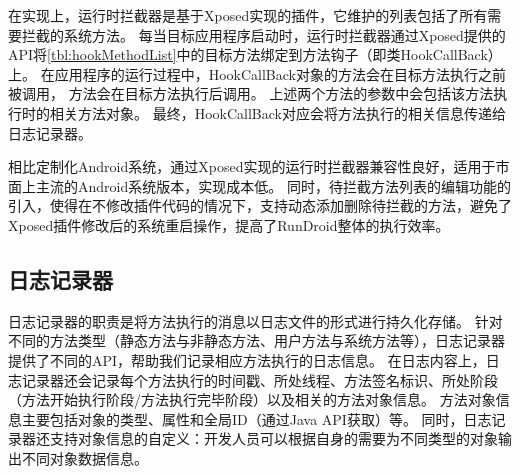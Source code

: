 

在实现上，运行时拦截器是基于Xposed\cite{Xposed}实现的插件，它维护的列表包括了所有需要拦截的系统方法。%
每当目标应用程序启动时，运行时拦截器通过Xposed提供的API将\autoref{tbl:hookMethodList}中的目标方法绑定到方法钩子（即类HookCallBack）上。
在应用程序的运行过程中，HookCallBack对象的方法会在目标方法执行之前被调用，
方法会在目标方法执行后调用。
上述两个方法的参数中会包括该方法执行时的相关方法对象。
最终，HookCallBack对应会将方法执行的相关信息传递给日志记录器。



相比定制化Android系统，通过Xposed实现的运行时拦截器兼容性良好，适用于市面上主流的Android系统版本，实现成本低。
同时，待拦截方法列表的编辑功能的引入，使得在不修改插件代码的情况下，支持动态添加删除待拦截的方法，避免了Xposed插件修改后的系统重启操作，提高了RunDroid整体的执行效率。
 

\subsection{日志记录器}

日志记录器的职责是将方法执行的消息以日志文件的形式进行持久化存储。
针对不同的方法类型（静态方法与非静态方法、用户方法与系统方法等），日志记录器提供了不同的API，帮助我们记录相应方法执行的日志信息。
在日志内容上，日志记录器还会记录每个方法执行的时间戳、所处线程、方法签名标识、所处阶段（方法开始执行阶段/方法执行完毕阶段）以及相关的方法对象信息。
方法对象信息主要包括对象的类型、属性和全局ID（通过Java API获取）等。
同时，日志记录器还支持对象信息的自定义：开发人员可以根据自身的需要为不同类型的对象输出不同对象数据信息。





